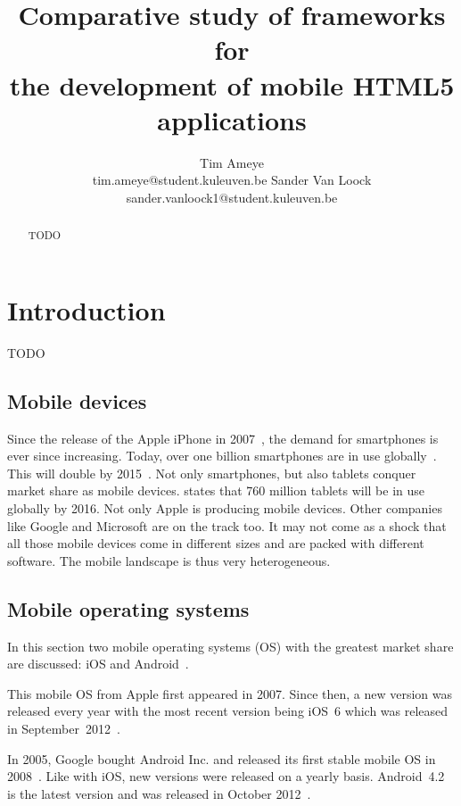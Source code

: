 \documentclass[a4paper]{artikel3}
\title{Comparative study of frameworks for \\ the development of mobile HTML5 applications}
\author{Tim Ameye \\ tim.ameye@student.kuleuven.be \And Sander Van Loock \\ sander.vanloock1@student.kuleuven.be}
\renewcommand{\paragraph}[1]{\vspace{2mm} \noindent {\bf #1}  }
\begin{document}
\maketitle

\begin{abstract}
TODO

\end{abstract}

\section{Introduction} %
\label{sec:introduction}
TODO

\subsection{Mobile devices}
Since the release of the Apple iPhone in 2007~\cite{David2011}, the demand for smartphones is ever since increasing. 
Today, over one billion smartphones are in use globally~\cite{Yang2012}.
This will double by 2015~\cite{Gillett2012}.
Not only smartphones, but also tablets conquer market share as mobile devices.
\cite{Gillett2012} states that 760 million tablets will be in use globally by 2016.
Not only Apple is producing mobile devices.
Other companies like Google and Microsoft are on the track too.
It may not come as a shock that all those mobile devices come in different sizes and are packed with different software.
The mobile landscape is thus very heterogeneous. 

\subsection{Mobile operating systems}
In this section two mobile operating systems (OS) with the greatest market share are discussed: iOS and Android~\cite{David2011, Hales2012}.

\paragraph{iOS}
This mobile OS from Apple first appeared in 2007.
Since then, a new version was released every year with the most recent version being iOS~6 which was released in September~2012~\cite{Deitel2012, PhilDutson2012}.
 
\paragraph{Android}
In 2005, Google bought Android Inc. and released its first stable mobile OS in 2008~\cite{Satyesh2012}.
Like with iOS, new versions were released on a yearly basis.
Android~4.2 is the latest version and was released in October 2012~\cite{Sawers2012}.
\end{document}
